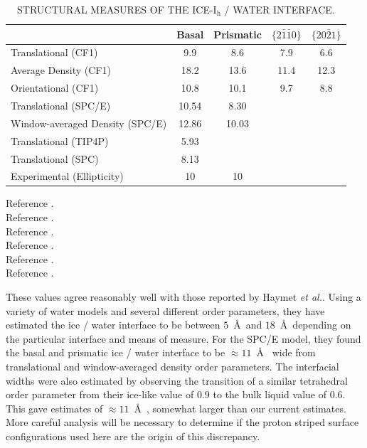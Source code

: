 \begin{table}[h]
\centering
\caption{STRUCTURAL MEASURES OF THE ICE-I$_\mathrm{h}$ / WATER
  INTERFACE. \label{tab:structCompare}} 
\begin{tabular}{|l|cccc|}  
\hline
& Basal & Prismatic & $\{2\bar{1}\bar{1}0\}$ & $\{20\bar{2}1\}$ \\
\hline
Translational (CF1)\footnotemark[1] & 9.9 & 8.6  & 7.9 & 6.6 \\
Average Density (CF1)\footnotemark[1] & 18.2 & 13.6 & 11.4 & 12.3 \\
Orientational (CF1)\footnotemark[2] & 10.8 & 10.1 & 9.7 & 8.8 \\
Translational (SPC/E)\footnotemark[5] & 10.54 & 8.30 & & \\
Window-averaged Density (SPC/E) \footnotemark[5] & 12.86 & 10.03 & & \\
Translational (TIP4P)\footnotemark[3] & 5.93 & & & \\
Translational (SPC)\footnotemark[4] & 8.13 & & & \\
Experimental (Ellipticity)\footnotemark[6] & 10 & 10 & & \\
\hline
\end{tabular}
\flushleft
  \footnotemark[1]\footnotesize{Reference \cite{Hayward2001}.} \\
  \footnotemark[2]\footnotesize{Reference \cite{Hayward2002}.} \\
  \footnotemark[3]\footnotesize{Reference \cite{Karim1988}.} \\
  \footnotemark[4]\footnotesize{Reference \cite{Karim1990}.} \\
  \footnotemark[5]\footnotesize{Reference \cite{Bryk2002}.} \\
  \footnotemark[6]\footnotesize{Reference \cite{Beaglehole1993}.} \\
\end{table}



These values agree reasonably well with those reported by Haymet
\textit{et
  al.}.\cite{Karim1988,Karim1990,Hayward2001,Bryk2002,Hayward2002,Bryk2004}
Using a variety of water models and several different order
parameters, they have estimated the ice / water interface to be
between $5$~\AA~and $18$~\AA~depending on the particular interface and
means of measure.  For the SPC/E model, they found the basal and
prismatic ice / water interface to be $\approx 11$~\AA~ wide from
translational and window-averaged density order parameters. The
interfacial widths were also estimated by observing the transition of
a similar tetrahedral order parameter from their ice-like value of
$0.9$ to the bulk liquid value of $0.6$. This gave estimates of
$\approx 11$~\AA~, somewhat larger than our current estimates. More
careful analysis will be necessary to determine if the proton striped
surface configurations used here are the origin of this discrepancy.


